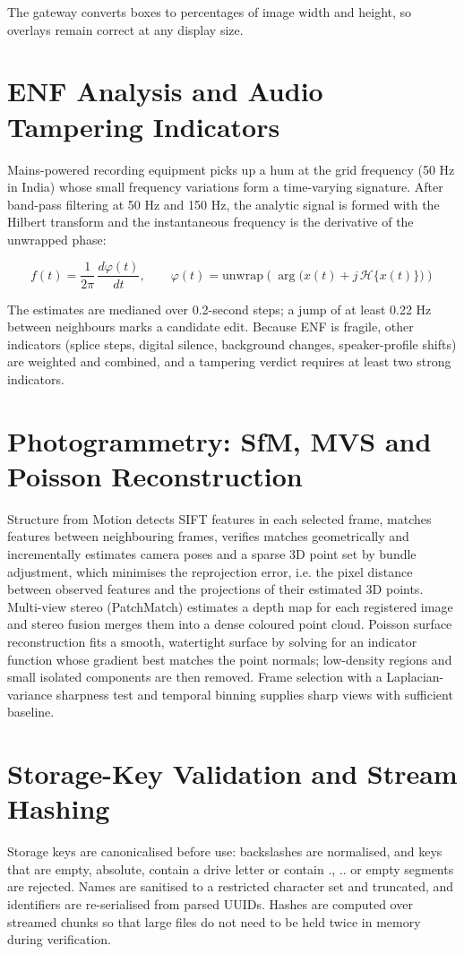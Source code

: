\documentclass[12pt,a4paper,oneside]{report}
\newcommand{\code}[1]{{\small\ttfamily #1}}
\begin{document}
The gateway converts boxes to percentages of image width and height, so overlays remain correct at any display size.

\section{ENF Analysis and Audio Tampering Indicators}
Mains-powered recording equipment picks up a hum at the grid frequency (50 Hz in India) whose small frequency variations form a time-varying signature. After band-pass filtering at 50 Hz and 150 Hz, the analytic signal is formed with the Hilbert transform and the instantaneous frequency is the derivative of the unwrapped phase:

\begin{equation*}
f(t) = \frac{1}{2\pi}\,\frac{d\varphi(t)}{dt}, \qquad \varphi(t) = \mathrm{unwrap}\!\left(\arg\big(x(t) + j\,\mathcal{H}\{x(t)\}\big)\right)
\end{equation*}

The estimates are medianed over 0.2-second steps; a jump of at least 0.22 Hz between neighbours marks a candidate edit. Because ENF is fragile, other indicators (splice steps, digital silence, background changes, speaker-profile shifts) are weighted and combined, and a tampering verdict requires at least two strong indicators.

\section{Photogrammetry: SfM, MVS and Poisson Reconstruction}
Structure from Motion detects SIFT features in each selected frame, matches features between neighbouring frames, verifies matches geometrically and incrementally estimates camera poses and a sparse 3D point set by bundle adjustment, which minimises the reprojection error, i.e. the pixel distance between observed features and the projections of their estimated 3D points. Multi-view stereo (PatchMatch) estimates a depth map for each registered image and stereo fusion merges them into a dense coloured point cloud. Poisson surface reconstruction fits a smooth, watertight surface by solving for an indicator function whose gradient best matches the point normals; low-density regions and small isolated components are then removed. Frame selection with a Laplacian-variance sharpness test and temporal binning supplies sharp views with sufficient baseline.

\section{Storage-Key Validation and Stream Hashing}
Storage keys are canonicalised before use: backslashes are normalised, and keys that are empty, absolute, contain a drive letter or contain \code{.}, \code{..} or empty segments are rejected. Names are sanitised to a restricted character set and truncated, and identifiers are re-serialised from parsed UUIDs. Hashes are computed over streamed chunks so that large files do not need to be held twice in memory during verification.
\end{document}
